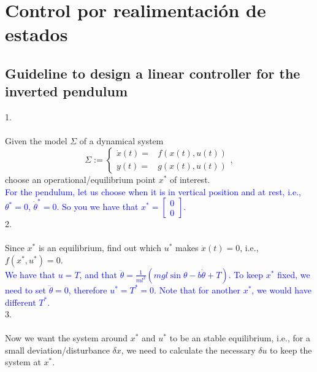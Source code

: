 \chapter{Control por realimentación de estados}

\section{Guideline to design a linear controller for the inverted pendulum}
1. \\ \\
Given the model $\Sigma$ of a dynamical system
\begin{equation}
	\Sigma := \begin{cases}
		\dot x(t) =& f(x(t),u(t)) \\ y(t) =& g(x(t),u(t))
	\end{cases}, \nonumber
\end{equation}
choose an operational/equilibrium point $x^*$ of interest. \\

\textcolor{blue}{For the pendulum, let us choose when it is in vertical position and at rest, i.e., $\theta^* = 0$, $\dot\theta^* = 0$. So you we have that $x^* = \begin{bmatrix}0 \\ 0\end{bmatrix}$.} \\

2. \\ \\
Since $x^*$ is an equilibrium, find out which $u^*$ makes $\dot x(t) = 0$, i.e., $f(x^*,u^*) = 0$. \\
\textcolor{blue}{We have that $u = T$, and that $\ddot\theta = \frac{1}{ml^2}\left(mgl\sin\theta - b\dot\theta + T\right)$. To keep $x^*$ fixed, we need to set $\ddot\theta = 0$, therefore $u^* = T^* = 0$. Note that for another $x^*$, we would have different $T^*$.} \\

3. \\ \\
Now we want the system around $x^*$ and $u^*$ to be an stable equilibrium, i.e., for a small deviation/disturbance $\delta x$, we need to calculate the necessary $\delta u$ to keep the system at $x^*$.

